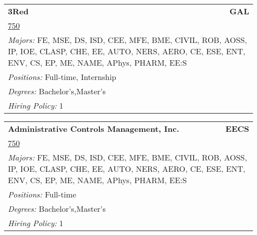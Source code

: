 \documentclass[twoside]{article}
\begin{document}
    \begin{center}\begin{multicols}{3}
    \begin{FlushLeft}
    \begin{minipage}{.9\columnwidth}\begin{tabularx}{.95\columnwidth}{Xr}
                 {\Large\bf 3Red} & {\Large\bf GAL}\\
    \multicolumn{2}{p{.95\columnwidth}}{\url{750}}\\
    \multicolumn{2}{p{.95\columnwidth}}{\emph{Majors:} FE, MSE, DS, ISD, CEE, MFE, BME, CIVIL, ROB, AOSS, IP, IOE, CLASP, CHE, EE, AUTO, NERS, AERO, CE, ESE, ENT, ENV, CS, EP, ME, NAME, APhys, PHARM, EE:S}\\
    \multicolumn{2}{p{.95\columnwidth}}{\emph{Positions:} Full-time, Internship}\\
    \multicolumn{2}{p{.95\columnwidth}}{\emph{Degrees:} Bachelor's,Master's}\\
    \multicolumn{2}{p{.95\columnwidth}}{\emph{Hiring Policy:} 1}\\
    \end{tabularx}
    
\end{minipage}
 
\begin{minipage}{.9\columnwidth}\begin{tabularx}{.95\columnwidth}{Xr}
                 {\Large\bf Administrative Controls Management, Inc.} & {\Large\bf EECS}\\
    \multicolumn{2}{p{.95\columnwidth}}{\url{750}}\\
    \multicolumn{2}{p{.95\columnwidth}}{\emph{Majors:} FE, MSE, DS, ISD, CEE, MFE, BME, CIVIL, ROB, AOSS, IP, IOE, CLASP, CHE, EE, AUTO, NERS, AERO, CE, ESE, ENT, ENV, CS, EP, ME, NAME, APhys, PHARM, EE:S}\\
    \multicolumn{2}{p{.95\columnwidth}}{\emph{Positions:} Full-time}\\
    \multicolumn{2}{p{.95\columnwidth}}{\emph{Degrees:} Bachelor's,Master's}\\
    \multicolumn{2}{p{.95\columnwidth}}{\emph{Hiring Policy:} 1}\\
    \end{tabularx}
    
\end{minipage}
 

\end{FlushLeft}
\end{multicols}
\end{center}
\end{document}
